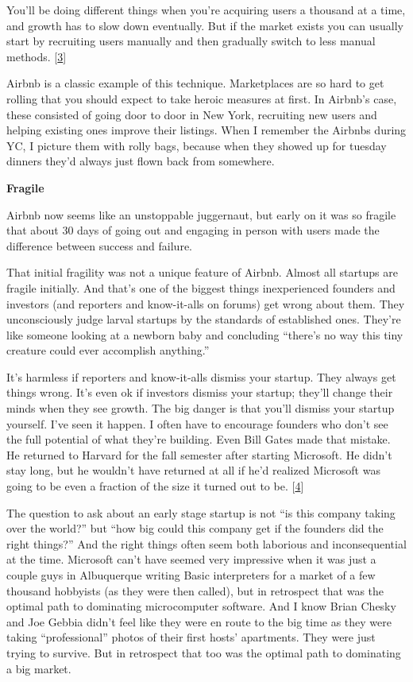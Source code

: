 You'll be doing different things when you're acquiring users a thousand
at a time, and growth has to slow down eventually. But if the market
exists you can usually start by recruiting users manually and then
gradually switch to less manual methods. {[}\hyperref[f3n]{3}{]}

Airbnb is a classic example of this technique. Marketplaces are so hard
to get rolling that you should expect to take heroic measures at first.
In Airbnb's case, these consisted of going door to door in New York,
recruiting new users and helping existing ones improve their listings.
When I remember the Airbnbs during YC, I picture them with rolly bags,
because when they showed up for tuesday dinners they'd always just flown
back from somewhere.

\textbf{Fragile}

Airbnb now seems like an unstoppable juggernaut, but early on it was so
fragile that about 30 days of going out and engaging in person with
users made the difference between success and failure.

That initial fragility was not a unique feature of Airbnb. Almost all
startups are fragile initially. And that's one of the biggest things
inexperienced founders and investors (and reporters and know-it-alls on
forums) get wrong about them. They unconsciously judge larval startups
by the standards of established ones. They're like someone looking at a
newborn baby and concluding ``there's no way this tiny creature could
ever accomplish anything.''

It's harmless if reporters and know-it-alls dismiss your startup. They
always get things wrong. It's even ok if investors dismiss your startup;
they'll change their minds when they see growth. The big danger is that
you'll dismiss your startup yourself. I've seen it happen. I often have
to encourage founders who don't see the full potential of what they're
building. Even Bill Gates made that mistake. He returned to Harvard for
the fall semester after starting Microsoft. He didn't stay long, but he
wouldn't have returned at all if he'd realized Microsoft was going to be
even a fraction of the size it turned out to be. {[}\hyperref[f4n]{4}{]}

The question to ask about an early stage startup is not ``is this
company taking over the world?'' but ``how big could this company get if
the founders did the right things?'' And the right things often seem
both laborious and inconsequential at the time. Microsoft can't have
seemed very impressive when it was just a couple guys in Albuquerque
writing Basic interpreters for a market of a few thousand hobbyists (as
they were then called), but in retrospect that was the optimal path to
dominating microcomputer software. And I know Brian Chesky and Joe
Gebbia didn't feel like they were en route to the big time as they were
taking ``professional'' photos of their first hosts' apartments. They
were just trying to survive. But in retrospect that too was the optimal
path to dominating a big market.

